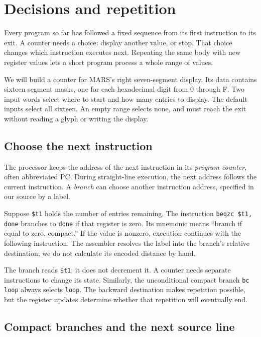\chapter{Decisions and repetition}
\label{revision:decisions-and-repetition}

Every program so far has followed a fixed sequence from its first instruction to
its exit. A counter needs a choice: display another value, or stop. That choice
changes which instruction executes next. Repeating the same body with new register
values lets a short program process a whole range of values.

We will build a counter for MARS's right seven-segment display. Its data contains
sixteen segment masks, one for each hexadecimal digit from 0 through F. Two input
words select where to start and how many entries to display. The default inputs
select all sixteen. An empty range selects none, and must reach the exit without
reading a glyph or writing the display.

\section{Choose the next instruction}

The processor keeps the address of the next instruction in its \emph{program
  counter}, often abbreviated PC. During straight-line execution, the next address
follows the current instruction. A \emph{branch} can choose another instruction
address, specified in our source by a label.

Suppose \texttt{\$t1} holds the number of entries remaining. The instruction
\texttt{beqzc \$t1, done} branches to \texttt{done} if that register is zero.
Its mnemonic means ``branch if equal to zero, compact.'' If the value is nonzero,
execution continues with the following instruction. The assembler resolves the
label into the branch's relative destination; we do not calculate its encoded
distance by hand.

The branch reads \texttt{\$t1}; it does not decrement it. A counter needs separate
instructions to change its state. Similarly, the unconditional compact branch
\texttt{bc loop} always selects \texttt{loop}. The backward destination makes
repetition possible, but the register updates determine whether that repetition
will eventually end.

\section{Compact branches and the next source line}

